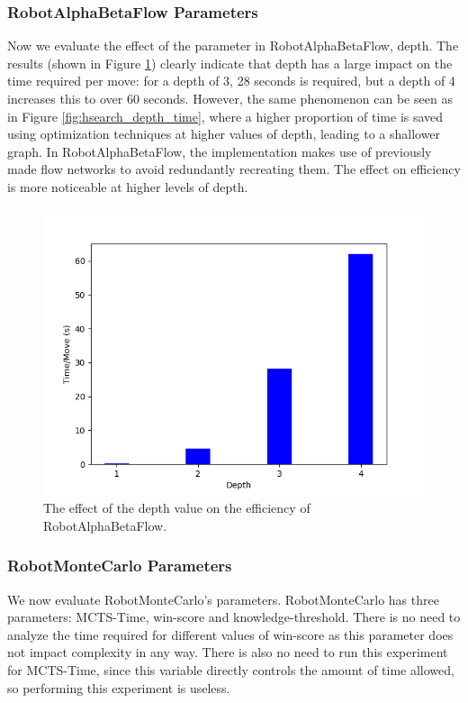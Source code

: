 \subsubsection{RobotAlphaBetaFlow Parameters}
Now we evaluate the effect of the parameter in RobotAlphaBetaFlow, depth. The results (shown in Figure \ref{fig:flow_depth_time}) clearly indicate that depth has a large impact on the time required per move: for a depth of 3, 28 seconds is required, but a depth of 4 increases this to over 60 seconds. However, the same phenomenon can be seen as in Figure \ref{fig:hsearch_depth_time}, where a higher proportion of time is saved using optimization techniques at higher values of depth, leading to a shallower graph. In RobotAlphaBetaFlow, the implementation makes use of previously made flow networks to avoid redundantly recreating them. The effect on efficiency is more noticeable at higher levels of depth. 


\begin{figure}
    \centering
    \includegraphics[scale = 0.6]{images/FLOWDEPTH_TIME_INF.png}
    \caption{The effect of the depth value on the efficiency of RobotAlphaBetaFlow.}
    \label{fig:flow_depth_time}
\end{figure}


\subsubsection{RobotMonteCarlo Parameters}
We now evaluate RobotMonteCarlo's parameters. RobotMonteCarlo has three parameters: MCTS-Time, win-score and knowledge-threshold. There is no need to analyze the time required for different values of win-score as this parameter does not impact complexity in any way. There is also no need to run this experiment for MCTS-Time, since this variable directly controls the amount of time allowed, so performing this experiment is useless.




